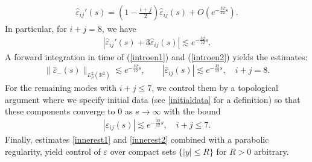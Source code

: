 \documentclass[11pt,reqno]{amsart}
\theoremstyle{definition}
\theoremstyle{bfremark}
\numberwithin{equation}{section}
\newcommand{\veph}{\hat\varepsilon }
\begin{document}
\begin{itemize}
\begin{align*}
        \veph_{ij}'(s)=\left(1-\frac{i+j}{2}\right)\veph_{ij}(s)+O(e^{-\frac{32}{12}s}).
\end{align*}
In particular, for \(i+j=8\), we have
\begin{align}
        |\veph_{ij}'(s)+3\veph_{ij}(s)| \lesssim e^{-\frac{32}{12}s}.\label{introen2}
\end{align}
A forward integration in time of (\ref{introen1}) and (\ref{introen2}) yields the estimates:
\begin{align}
    \|\veph_-(s)\|_{L^2_{\rho}(\mathbb{R}^2)} \lesssim e^{-\frac{32}{12}s}, \qquad |\veph_{ij}(s)| \lesssim e^{-\frac{32}{12}s}, \quad i+j = 8.\label{innerest1}
\end{align}
For the remaining modes with \(i+j\leq 7\), we control them by a topological argument where we specify initial data (see \eqref{initialdata} for a definition) so that these components converge to \(0\) as \(s \to \infty\) with the bound
\begin{align}
    |\veph_{ij}(s)| \lesssim e^{-\frac{32}{12}s}, \quad i+j \leq 7.\label{innerest2}
\end{align}
Finally, estimates \ref{innerest1} and \ref{innerest2} combined with a parabolic regularity, yield control of \(\varepsilon\) over compact sets $\{|y| \leq R\}$ for $R > 0$ arbitrary.\\


\end{itemize}
\end{document}
